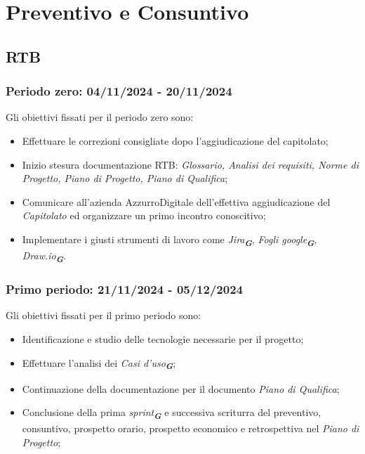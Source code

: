 
\section{Preventivo e Consuntivo}
\label{sec:preventivo e consuntivo}

\subsection{RTB}
\subsubsection{Periodo zero: 04/11/2024 - 20/11/2024}
Gli obiettivi fissati per il periodo zero sono:
\begin{itemize}
    \item Effettuare le correzioni consigliate dopo l'aggiudicazione del capitolato;
    \item Inizio stesura documentazione RTB: \textit{Glossario, Analisi dei requisiti, Norme di Progetto, Piano di Progetto, Piano di Qualifica};
    \item Comunicare all'azienda AzzurroDigitale dell'effettiva aggiudicazione del \textit{Capitolato} ed organizzare un primo incontro conoscitivo;
    \item Implementare i giusti strumenti di lavoro come {\emph{Jira}}\textsubscript{\textit{\textbf{G}}}, {\emph{Fogli google}}\textsubscript{\textit{\textbf{G}}}, {\emph{Draw.io}}\textsubscript{\textit{\textbf{G}}}.
\end{itemize}

\subsubsection{Primo periodo: 21/11/2024 - 05/12/2024}
Gli obiettivi fissati per il primo periodo sono:
\begin{itemize}
    \item Identificazione e studio delle tecnologie necessarie per il progetto;
    \item Effettuare l'analisi dei {\emph{Casi d'uso}}\textsubscript{\textit{\textbf{G}}};
    \item Continuazione della documentazione per il documento \textit{Piano di Qualifica};
    \item Conclusione della prima {\emph{sprint}}\textsubscript{\textit{\textbf{G}}} e successiva scriturra del preventivo, consuntivo, prospetto orario, prospetto economico e retrospettiva nel \textit{Piano di Progetto};
\end{itemize}

